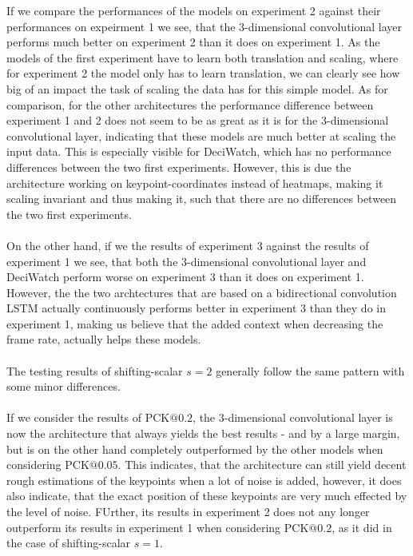 \documentclass[./main.tex]{subfiles}
\begin{document}
If we compare the performances of the models on experiment 2 against their performances on expeirment 1 we see, that the 3-dimensional convolutional layer performs much better on experiment 2 than it does on experiment 1. As the models of the first experiment have to learn both translation and scaling, where for experiment 2 the model only has to learn translation, we can clearly see how big of an impact the task of scaling the data has for this simple model. As for comparison, for the other architectures the performance difference between experiment 1 and 2 does not seem to be as great as it is for the 3-dimensional convolutional layer, indicating that these models are much better at scaling the input data. This is especially visible for DeciWatch, which has no performance differences between the two first experiments. However, this is due the architecture working on keypoint-coordinates instead of heatmaps, making it scaling invariant and thus making it, such that there are no differences between the two first experiments.
\\
\\
On the other hand, if we the results of experiment 3 against the results of experiment 1 we see, that both the 3-dimensional convolutional layer and DeciWatch perform worse on experiment 3 than it does on experiment 1. However, the the two archtectures that are based on a bidirectional convolution LSTM actually continuously performs better in experiment 3 than they do in experiment 1, making us believe that the added context when decreasing the frame rate, actually helps these models.
\\
\\
The testing results of shifting-scalar $s = 2$ generally follow the same pattern with some minor differences. 
\\
\\
If we consider the results of PCK$@0.2$, the 3-dimensional convolutional layer is now the architecture that always yields the best results - and by a large margin, but is on the other hand completely outperformed by the other models when considering PCK$@0.05$. This indicates, that the architecture can still yield decent rough estimations of the keypoints when a lot of noise is added, however, it does also indicate, that the exact position of these keypoints are very much effected by the level of noise. FUrther, its results in experiment 2 does not any longer outperform its results in experiment 1 when considering PCK$@0.2$, as it did in the case of shifting-scalar $s = 1$.
\\
\end{document}

